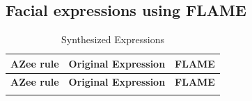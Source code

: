 \documentclass[../main.tex]{subfiles}
\begin{document}
\subsection{Facial expressions using FLAME}
\label{annex:facial_expressions:flame}

\begin{longtable}{|l|c|r|}
    \caption{Synthesized Expressions} \label{tab:facial_expressions} \\
    \hline
    \textbf{AZee rule} & \textbf{Original Expression} & \textbf{FLAME}  \\
    \hline
    \endfirsthead

    \hline
    \textbf{AZee rule} & \textbf{Original Expression} & \textbf{FLAME} \\
    \hline
    \endhead

    \hline
    \endfoot

    \hline
    \endlastfoot


\end{longtable}
\end{document}
